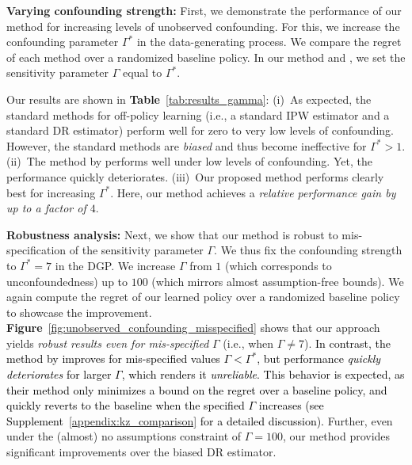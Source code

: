 \documentclass{article} %
\theoremstyle{plain}
\theoremstyle{definition}
\theoremstyle{remark}
\newcommand{\rebuttal}[1]{\textcolor{black}{#1}}
\begin{document}
\textbf{Varying confounding strength:} First, we demonstrate the performance of our method for increasing levels of unobserved confounding. For this, we increase the confounding parameter $\Gamma^*$ in the data-generating process. We compare the regret of each method over a randomized baseline policy. In our method and \citep{Kallus.2018c,Kallus.2021d}, we set the sensitivity parameter $\Gamma$ equal to $\Gamma^*$. 

Our results are shown in \textbf{Table}~\ref{tab:results_gamma}: (i)~As expected, the standard methods for off-policy learning (i.e., a standard IPW estimator and a standard DR estimator) perform well for zero to very low levels of confounding. However, the standard methods are \emph{biased} and thus become ineffective for $\Gamma^*>1$. (ii)~The method by \citet{Kallus.2018c,Kallus.2021d} performs well under low levels of confounding. Yet, the performance quickly deteriorates. (iii)~Our proposed method performs clearly best for increasing $\Gamma^*$. Here, our method achieves a \emph{relative performance gain by up to a factor of $4$}.



\textbf{Robustness analysis:} Next, we show that our method is robust to mis-specification of the sensitivity parameter $\Gamma$. We thus fix the confounding strength to $\Gamma^*=7$ in the DGP. We increase $\Gamma$ from $1$ (which corresponds to unconfoundedness) up to $100$ (which mirrors almost assumption-free bounds). We again compute the regret of our learned policy over a randomized baseline policy to showcase the improvement. %
\textbf{Figure}~\ref{fig:unobserved_confounding_misspecified} shows that our approach yields \emph{robust results even for mis-specified} $\Gamma$ (i.e., when $\Gamma \neq 7$). \rebuttal{In contrast, the method by \citet{Kallus.2018c,Kallus.2021d} improves for mis-specified values $\Gamma<\Gamma^*$, but performance \emph{quickly deteriorates} for larger $\Gamma$, which renders it \emph{unreliable}. This behavior is expected, as their method only minimizes a bound on the regret over a baseline policy, and quickly reverts to the baseline when the specified $\Gamma$ increases (see Supplement~\ref{appendix:kz_comparison} for a detailed discussion).} Further, even under the (almost) no assumptions constraint of $\Gamma=100$, our method provides significant improvements over the biased DR estimator.
\end{document}
